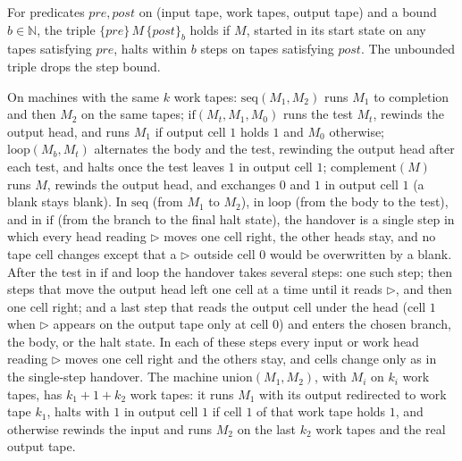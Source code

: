 \begin{definition}
  \label{def:models-hoare}
  \leanok
  For predicates $\mathit{pre}, \mathit{post}$ on (input tape, work tapes,
  output tape) and a bound $b \in \mathbb{N}$, the triple
  $\{\mathit{pre}\}\, M\, \{\mathit{post}\}_b$ holds if $M$, started in its
  start state on any tapes satisfying $\mathit{pre}$, halts within $b$ steps on
  tapes satisfying $\mathit{post}$. The unbounded triple drops the step bound.
\end{definition}

\begin{definition}
  \label{def:models-combinators}
  \leanok
  On machines with the same $k$ work tapes: $\mathrm{seq}(M_1, M_2)$ runs $M_1$
  to completion and then $M_2$ on the same tapes; $\mathrm{if}(M_t, M_1, M_0)$
  runs the test $M_t$, rewinds the output head, and runs $M_1$ if output cell
  $1$ holds $1$ and $M_0$ otherwise; $\mathrm{loop}(M_b, M_t)$ alternates the
  body and the test, rewinding the output head after each test, and halts once
  the test leaves $1$ in output cell $1$; $\mathrm{complement}(M)$ runs $M$,
  rewinds the output head, and exchanges $0$ and $1$ in output cell $1$ (a
  blank stays blank). In $\mathrm{seq}$ (from $M_1$ to $M_2$), in
  $\mathrm{loop}$ (from the body to the test), and in $\mathrm{if}$ (from the
  branch to the final halt state), the handover is a single step in which
  every head reading $\triangleright$ moves one cell right, the other heads
  stay, and no tape cell changes except that a $\triangleright$ outside cell
  $0$ would be overwritten by a blank. After the test in $\mathrm{if}$ and
  $\mathrm{loop}$ the handover takes several steps: one such step; then steps
  that move the output head left one cell at a time until it reads
  $\triangleright$, and then one cell right; and a last step that reads the
  output cell under the head (cell $1$ when $\triangleright$ appears on the
  output tape only at cell $0$) and enters the chosen branch, the body, or the
  halt state. In each of these steps every input or work head reading
  $\triangleright$ moves one cell right and the others stay, and cells change
  only as in the single-step handover. The machine
  $\mathrm{union}(M_1, M_2)$, with $M_i$ on $k_i$ work tapes, has
  $k_1 + 1 + k_2$ work tapes: it runs $M_1$ with its output redirected to work
  tape $k_1$, halts with $1$ in output cell $1$ if cell $1$ of that work tape
  holds $1$, and otherwise rewinds the input and runs $M_2$ on the last $k_2$
  work tapes and the real output tape.
\end{definition}


